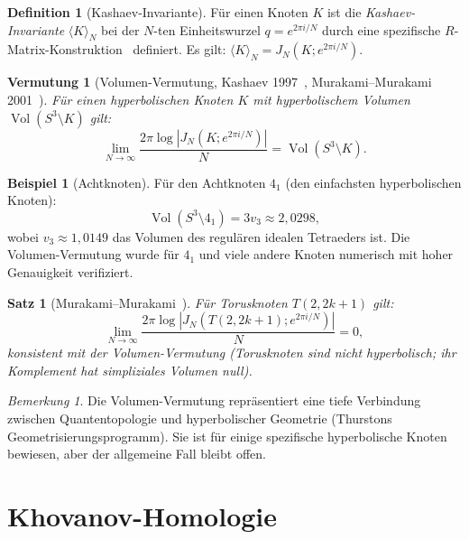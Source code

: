 \documentclass[12pt,a4paper]{amsart}
\newtheorem{satz}[theorem]{Satz}
\newtheorem{vermutung}[theorem]{Vermutung}
\theoremstyle{definition}
\newtheorem{definition_de}[theorem]{Definition}
\newtheorem{beispiel}[theorem]{Beispiel}
\theoremstyle{remark}
\newtheorem{bemerkung}[theorem]{Bemerkung}
\DeclareMathOperator{\Vol}{Vol}
\begin{document}
\begin{definition_de}[Kashaev-Invariante]
Für einen Knoten $K$ ist die \emph{Kashaev-Invariante} $\langle K \rangle_N$
bei der $N$-ten Einheitswurzel $q = e^{2\pi i/N}$ durch eine spezifische
$R$-Matrix-Konstruktion~\cite{Kashaev1997} definiert. Es gilt:
$\langle K \rangle_N = J_N(K; e^{2\pi i/N})$.
\end{definition_de}

\begin{vermutung}[Volumen-Vermutung, Kashaev 1997~\cite{Kashaev1997}, Murakami--Murakami 2001~\cite{MurakamiMurakami2001}]
\label{verm:Volumen}
Für einen hyperbolischen Knoten $K$ mit hyperbolischem Volumen
$\Vol(S^3 \setminus K)$ gilt:
\[
    \lim_{N \to \infty} \frac{2\pi \log |J_N(K; e^{2\pi i/N})|}{N}
    = \Vol(S^3 \setminus K).
\]
\end{vermutung}

\begin{beispiel}[Achtknoten]
Für den Achtknoten $4_1$ (den einfachsten hyperbolischen Knoten):
\[
    \Vol(S^3 \setminus 4_1) = 3v_3 \approx 2{,}0298,
\]
wobei $v_3 \approx 1{,}0149$ das Volumen des regulären idealen Tetraeders ist.
Die Volumen-Vermutung wurde für $4_1$ und viele andere Knoten numerisch
mit hoher Genauigkeit verifiziert.
\end{beispiel}

\begin{satz}[Murakami--Murakami~\cite{MurakamiMurakami2001}]
Für Torusknoten $T(2,2k+1)$ gilt:
\[
    \lim_{N \to \infty} \frac{2\pi \log |J_N(T(2,2k+1); e^{2\pi i/N})|}{N} = 0,
\]
konsistent mit der Volumen-Vermutung (Torusknoten sind nicht hyperbolisch;
ihr Komplement hat simpliziales Volumen null).
\end{satz}

\begin{bemerkung}
Die Volumen-Vermutung repräsentiert eine tiefe Verbindung zwischen
Quantentopologie und hyperbolischer Geometrie (Thurstons Geometrisierungsprogramm).
Sie ist für einige spezifische hyperbolische Knoten bewiesen, aber der
allgemeine Fall bleibt offen.
\end{bemerkung}

\section{Khovanov-Homologie}
\end{document}
